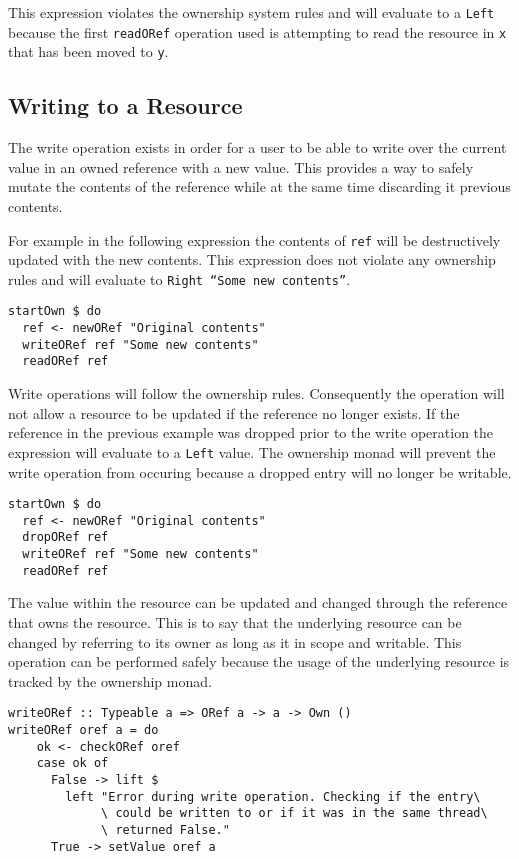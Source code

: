\documentclass[onehalf,11pt]{beavtex}
\begin{document}
This expression violates the ownership system rules and will evaluate to
a \texttt{Left} because the first \texttt{readORef} operation used is
attempting to read the resource in \texttt{x} that has been moved to \texttt{y}.


\subsection{Writing to a Resource}

The write operation exists in order for a user to be able to write over the
current value in an owned reference with a new value. This provides a way to
safely mutate the contents of the reference while at the same time discarding
it previous contents.

For example in the following expression the contents of \texttt{ref}
will be destructively updated with the new contents. This expression does
not violate any ownership rules and will evaluate
to \texttt{Right ``Some new contents''}. 

\begin{lstlisting}
startOwn $ do
  ref <- newORef "Original contents"
  writeORef ref "Some new contents"
  readORef ref
\end{lstlisting}

Write operations will follow the ownership rules. Consequently the operation
will not allow a resource to be updated if the reference no longer exists.
If the reference in the previous example was dropped prior to the
write operation the expression will evaluate to a \texttt{Left} value.
The ownership monad will prevent the write operation from occuring because
a dropped entry will no longer be writable.

\begin{lstlisting}
startOwn $ do
  ref <- newORef "Original contents"
  dropORef ref
  writeORef ref "Some new contents"
  readORef ref
\end{lstlisting}

The value within the resource can be updated and changed through the reference
that owns the resource.
This is to say that the underlying resource can be changed by referring to its
owner as long as it in scope and writable.
This operation can be performed safely because the usage
of the underlying resource is tracked by the ownership monad.

\begin{verbatim}
writeORef :: Typeable a => ORef a -> a -> Own ()
writeORef oref a = do
    ok <- checkORef oref
    case ok of
      False -> lift $
        left "Error during write operation. Checking if the entry\
             \ could be written to or if it was in the same thread\
             \ returned False."
      True -> setValue oref a
\end{verbatim}
\end{document}
